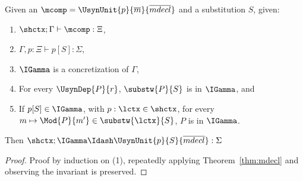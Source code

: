 \begin{theorem}
Given an $\mcomp = \UsynUnit{p}{\overline{m}}{\overline{mdecl}}$ and a substitution $S$, given:
\begin{enumerate}
\item $\shctx; \Gamma \vdash \mcomp : \Xi$,
\item $\Gamma, p : \Xi \vdash p[S] : \Sigma$,
\item $\IGamma$ is a concretization of $\Gamma$,
\item For every $\UsynDep{P}{r}$, $\substw{P}{S}$ is in $\IGamma$, and
\item If $p[S] \in \IGamma$, with $p : \lctx \in \shctx$, for every $m \mapsto \Mod{P}{m'} \in \substw{\lctx}{S}$, $P$ is in $\IGamma$.
\end{enumerate}
Then $\shctx; \IGamma \Idash \UsynUnit{p}{S}{\overline{mdecl}} : \Sigma$
\end{theorem}
\begin{proof}
Proof by induction on (1), repeatedly applying
Theorem~\ref{thm:mdecl} and observing the invariant is preserved.
\end{proof}

